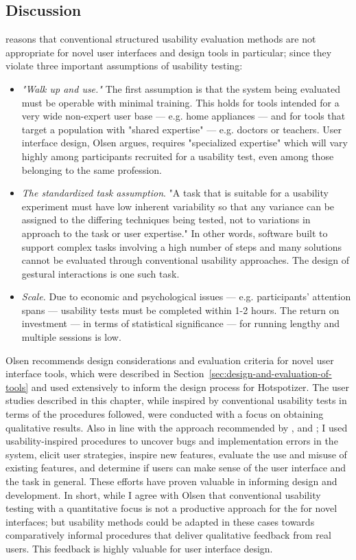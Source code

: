 \subsection{Discussion}

\textcite{Olsen:2007} reasons that conventional structured usability evaluation methods are not appropriate for novel user interfaces and design tools in particular; since they violate three important assumptions of usability testing:

\begin{itemize}
\item \emph{"Walk up and use."} The first assumption is that the system being evaluated must be operable with minimal training. This holds for tools intended for a very wide non-expert user base --- e.g. home appliances --- and for tools that target a population with "shared expertise" --- e.g. doctors or teachers. User interface design, Olsen argues, requires "specialized expertise" which will vary highly among participants recruited for a usability test, even among those belonging to the same profession.
\item \emph{The standardized task assumption}. "A task that is suitable for a usability experiment must have low inherent variability so that any variance can be assigned to the differing techniques being tested, not to variations in approach to the task or user expertise." \parencite{Olsen:2007} In other words, software built to support complex tasks involving a high number of steps and many solutions cannot be evaluated through conventional usability approaches. The design of gestural interactions is one such task.
\item \emph{Scale.} Due to economic and psychological issues --- e.g. participants' attention spans --- usability tests must be completed within 1-2 hours. The return on investment --- in terms of statistical significance --- for running lengthy and multiple sessions is low.
\end{itemize}

Olsen recommends design considerations and evaluation criteria for novel user interface tools, which were described in Section~\ref{sec:design-and-evaluation-of-tools} and used extensively to inform the design process for Hotspotizer. The user studies described in this chapter, while inspired by conventional usability tests in terms of the procedures followed, were conducted with a focus on obtaining qualitative results. Also in line with the approach recommended by \textcite{Nielsen:2000, Nielsen:2011}, and \textcite{Nielsen:1993}; I used usability-inspired procedures to uncover bugs and implementation errors in the system, elicit user strategies, inspire new features, evaluate the use and misuse of existing features, and determine if users can make sense of the user interface and the task in general. These efforts have proven valuable in informing design and development. In short, while I agree with Olsen that conventional usability testing with a quantitative focus is not a productive approach for the for novel interfaces; but usability methods could be adapted in these cases towards comparatively informal procedures that deliver qualitative feedback from real users. This feedback is highly valuable for user interface design.
